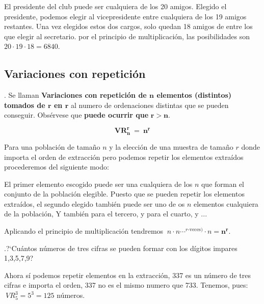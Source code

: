  \begin{small}
 	\textcolor{gris}{El presidente del club puede ser cualquiera de los 20 amigos. Elegido el presidente, podemos elegir al vicepresidente entre cualquiera de los 19 amigos restantes. Una vez elegidos estos dos cargos, solo quedan 18 amigos de entre los que elegir al secretario. por el principio de multiplicación, las posibilidades son $20\cdot 19\cdot 18=6840$.}
 	\end{small}

\subsection{Variaciones con repetición}

\begin{definition}
	. Se llaman \textbf{Variaciones con repetición de $\boldsymbol{n}$ elementos (distintos) tomados de $\boldsymbol{r}$ en $\boldsymbol{r}$} al numero de ordenaciones distintas que se pueden conseguir. Obsérvese que \textbf{puede ocurrir que} $\boldsymbol{r>n}$.	
	
	$$\boxed{ \ \boldsymbol{ VR_n^r\ = \ n^r } \ }$$
\end{definition}

\begin{small}Para una población de tamaño $n$ y la elección de una muestra de tamaño $r$ donde importa el orden de extracción pero podemos repetir los elementos extraídos procederemos del siguiente modo:
	
	El primer elemento escogido puede ser una cualquiera de los $n$ que forman el conjunto de la población elegible. Puesto que se pueden repetir los elementos extraídos, el segundo elegido también puede ser uno de os $n$ elementos cualquiera de la población, Y también para el tercero, y para el cuarto, y ... 
	
	Aplicando el principio de multiplicación tendremos $\ n\cdot n \cdots ^{r\text{-veces})} \cdot n =\boldsymbol{ n^r }$.\end{small}
	
\begin{example}
	.?`Cuántos números de tres cifras se pueden formar con los dígitos impares 1,3,5,7,9?	
	
	\vspace{4mm} Ahora sí podemos repetir elementos en la extracción, 337 es un número de tres cifras e importa el orden, 337 no es el mismo numero que 733. Tenemos, pues:
	$\ VR_5^3=5^3=125$ números.
	
\end{example}	

